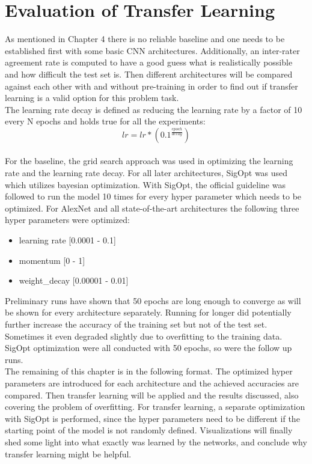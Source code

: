 \chapter{Evaluation of Transfer Learning}

As mentioned in Chapter 4 there is no reliable baseline and one needs to be established first with some basic CNN architectures. Additionally, an inter-rater agreement rate is computed to have a good guess what is realistically possible and how difficult the test set is. Then different architectures will be compared against each other with and without pre-training in order to find out if transfer learning is a valid option for this problem task. \\

The learning rate decay is defined as reducing the learning rate by a factor of 10 every N epochs and holds true for all the experiments: \\

\[ lr = lr * (0.1^{\frac{epoch}{decay}}) \] \\

For the baseline, the grid search approach was used in optimizing the learning rate and the learning rate decay. For all later architectures, SigOpt was used which utilizes bayesian optimization. With SigOpt, the official guideline was followed to run the model 10 times for every hyper parameter which needs to be optimized. For AlexNet and all state-of-the-art architectures the following three hyper parameters were optimized: \\

\begin{itemize}
  \item learning rate [0.0001 - 0.1]
  \item momentum [0 - 1]
  \item weight\_decay [0.00001 - 0.01]
\end{itemize} 

\quad

Preliminary runs have shown that 50 epochs are long enough to converge as will be shown for every architecture separately. Running for longer did potentially further increase the accuracy of the training set but not of the test set. Sometimes it even degraded slightly due to overfitting to the training data. SigOpt optimization were all conducted with 50 epochs, so were the follow up runs.\\


The remaining of this chapter is in the following format. The optimized hyper parameters are introduced for each architecture and the achieved accuracies are compared. Then transfer learning will be applied and the results discussed, also covering the problem of overfitting. For transfer learning, a separate optimization with SigOpt is performed, since the hyper parameters need to be different if the starting point of the model is not randomly defined. Visualizations will finally shed some light into what exactly was learned by the networks, and conclude why transfer learning might be helpful.








